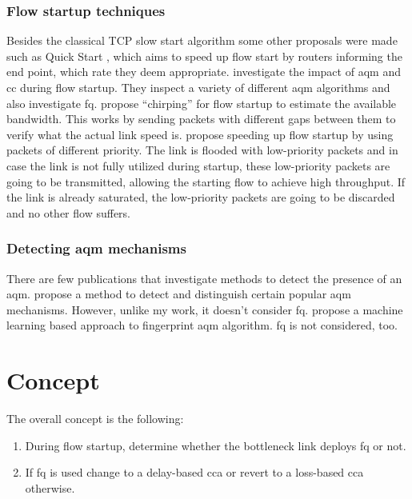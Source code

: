 \documentclass[conference]{IEEEtran}
\begin{document}
\subsubsection{Flow startup techniques} Besides the classical TCP slow start algorithm \citep{stevens_tcp_1997} some other proposals were made such as Quick Start \citep{jain_quick-start_2019}, which aims to speed up flow start by routers informing the end point, which rate they deem appropriate. \citep{jarvinen_congestion_2019} investigate the impact of \gls{aqm} and \gls{cc} during flow startup. They inspect a variety of different \gls{aqm} algorithms and also investigate \gls{fq}. \citep{kuhlewind_chirping_2010} propose ``chirping'' for flow startup to estimate the available bandwidth. This works by sending packets with different gaps between them to verify what the actual link speed is. \citep{mittal_recursively_2014} propose speeding up flow startup by using packets of different priority. The link is flooded with low-priority packets and in case the link is not fully utilized during startup, these low-priority packets are going to be transmitted, allowing the starting flow to achieve high throughput. If the link is already saturated, the low-priority packets are going to be discarded and no other flow suffers. 

\subsubsection{Detecting \gls{aqm} mechanisms} There are few publications that investigate methods to detect the presence of an \gls{aqm}. \citep{kargar_bideh_tada_2016} propose a method to detect and distinguish certain popular \gls{aqm} mechanisms. However, unlike my work, it doesn't consider \gls{fq}. \citep{baykal_detection_2017} propose a machine learning based approach to fingerprint \gls{aqm} algorithm. \gls{fq} is not considered, too. 

\section{Concept}
\label{sec:concept_fq}

The overall concept is the following:
\begin{enumerate}
\item During flow startup, determine whether the bottleneck link deploys \gls{fq} or not.
\item If \gls{fq} is used change to a delay-based \gls{cca} or revert to a loss-based \gls{cca} otherwise.
\end{enumerate}
\end{document}
